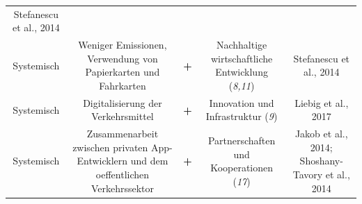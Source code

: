 \documentclass[
]{book}
\begin{document}
\begin{longtable}[]{@{}ccccc@{}}
\begin{minipage}[t]{0.17\columnwidth}
Stefanescu et al., 2014\strut
\end{minipage}\tabularnewline
\begin{minipage}[t]{0.17\columnwidth}\centering
Systemisch\strut
\end{minipage} & \begin{minipage}[t]{0.16\columnwidth}\centering
Weniger Emissionen, Verwendung von Papierkarten und Fahrkarten\strut
\end{minipage} & \begin{minipage}[t]{0.17\columnwidth}\centering
\textbf{+}\strut
\end{minipage} & \begin{minipage}[t]{0.17\columnwidth}\centering
Nachhaltige wirtschaftliche Entwicklung (\emph{8,11})\strut
\end{minipage} & \begin{minipage}[t]{0.17\columnwidth}\centering
Stefanescu et al., 2014\strut
\end{minipage}\tabularnewline
\begin{minipage}[t]{0.17\columnwidth}\centering
Systemisch\strut
\end{minipage} & \begin{minipage}[t]{0.16\columnwidth}\centering
Digitalisierung der Verkehrsmittel\strut
\end{minipage} & \begin{minipage}[t]{0.17\columnwidth}\centering
\textbf{+}\strut
\end{minipage} & \begin{minipage}[t]{0.17\columnwidth}\centering
Innovation und Infrastruktur (\emph{9})\strut
\end{minipage} & \begin{minipage}[t]{0.17\columnwidth}\centering
Liebig et al., 2017\strut
\end{minipage}\tabularnewline
\begin{minipage}[t]{0.17\columnwidth}\centering
Systemisch\strut
\end{minipage} & \begin{minipage}[t]{0.16\columnwidth}\centering
Zusammenarbeit zwischen privaten App-Entwicklern und dem oeffentlichen Verkehrssektor\strut
\end{minipage} & \begin{minipage}[t]{0.17\columnwidth}\centering
\textbf{+}\strut
\end{minipage} & \begin{minipage}[t]{0.17\columnwidth}\centering
Partnerschaften und Kooperationen (\emph{17})\strut
\end{minipage} & \begin{minipage}[t]{0.17\columnwidth}\centering
Jakob et al., 2014; Shoshany-Tavory et al., 2014\strut
\end{minipage}\tabularnewline
\bottomrule
\end{longtable}
\end{document}
